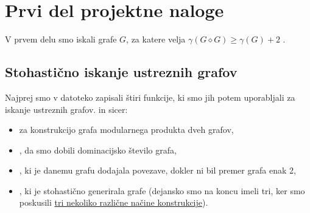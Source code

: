 \documentclass[a4paper,12pt]{article}
\theoremstyle{definition}
\begin{document}
\section{Prvi del projektne naloge}
V prvem delu smo iskali grafe $G$, za katere velja $\gamma(G \diamond G) \geq \gamma(G) + 2$ \label{pogoj}. \\

\subsection{Stohastično iskanje ustreznih grafov}
Najprej smo v datoteko  zapisali štiri funkcije, %
ki smo jih potem uporabljali za iskanje ustreznih grafov. in sicer:
\begin{itemize}
    \item {} za konstrukcijo grafa modularnega produkta dveh grafov,
    \item {}, da smo dobili dominacijsko število grafa,
    \item {}, ki je danemu grafu dodajala povezave, dokler ni bil premer grafa enak 2,
    \item {}, ki je stohastično generirala grafe (dejansko smo na koncu imeli tri, ker smo poskusili \hyperref[stohasticna]{tri nekoliko različne načine konstrukcije}).
\end{itemize}
\end{document}
